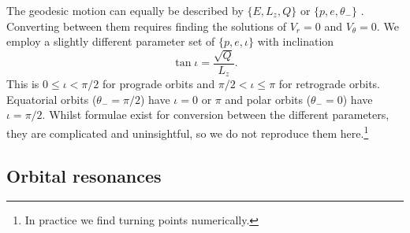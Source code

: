 The geodesic motion can equally be described by $\{E,L_z,Q\}$ or $\{p,e,\theta_-\}$ \citep{Schmidt2002}. Converting between them requires finding the solutions of $V_r = 0$ and $V_\theta = 0$. We employ a slightly different parameter set of $\{p,e,\iota\}$ with inclination \citep{Ryan1996,Glampedakis2002}
\begin{equation}
\tan \iota = \dfrac{\sqrt{Q}}{L_z}.
\end{equation}
This is $0 \leq \iota < \pi/2$ for prograde orbits and $\pi/2 < \iota \leq \pi$ for retrograde orbits. Equatorial orbits ($\theta_- = \pi/2$) have $\iota = 0$ or $\pi$ and polar orbits ($\theta_- = 0$) have $\iota = \pi/2$. Whilst formulae exist for conversion between the different parameters, they are complicated and uninsightful, so we do not reproduce them here.\footnote{In practice we find turning points numerically.}

\subsection{Orbital resonances}

